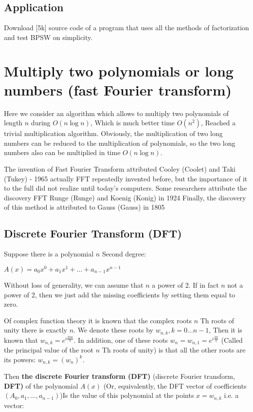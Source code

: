 \subsection{ Application }
Download [5k] source code of a program that uses all the methods of factorization and test BPSW on simplicity.

\section{ Multiply two polynomials or long numbers (fast Fourier transform)  }
Here we consider an algorithm which allows to multiply two polynomials of length $n$ during $O (n \log n)$, Which is much better time $O (n ^ 2)$, Reached a trivial multiplication algorithm. Obviously, the multiplication of two long numbers can be reduced to the multiplication of polynomials, so the two long numbers also can be multiplied in time $O (n \log n)$.

The invention of Fast Fourier Transform attributed Cooley (Coolet) and Taki (Tukey) - 1965 actually FFT repeatedly invented before, but the importance of it to the full did not realize until today's computers. Some researchers attribute the discovery FFT Runge (Runge) and Koenig (Konig) in 1924 Finally, the discovery of this method is attributed to Gauss (Gauss) in 1805

\subsection{ Discrete Fourier Transform (DFT) }

Suppose there is a polynomial $n$ Second degree:

$A(x)=a_{0}x^{0}+a_{1}x^{1}+\ldots+a_{n-1}x^{n-1}$

Without loss of generality, we can assume that $n$ a power of 2. If in fact $n$ not a power of 2, then we just add the missing coefficients by setting them equal to zero.

Of complex function theory it is known that the complex roots $n$ Th roots of unity there is exactly $n$. We denote these roots by $w_ {n, k}, k = 0 \ldots {n-1}$, Then it is known that $w_ {n, k} = e ^ {i \frac {2 \pi k} {n}}$. In addition, one of these roots $w_n = w_ {n, 1} = e ^ {i \frac {2 \pi} {n}}$ (Called the principal value of the root $n$ Th roots of unity) is that all the other roots are its powers: $w_ {n, k} = (w_n) ^ k$.

Then \textbf{the discrete Fourier transform (DFT)} (discrete Fourier transform, \textbf{DFT)} of the polynomial $A (x)$ (Or, equivalently, the DFT vector of coefficients $(A_0, a_1, \ldots, a_ {n-1})$)Is the value of this polynomial at the points $x = w_ {n, k}$ i.e. a vector:


